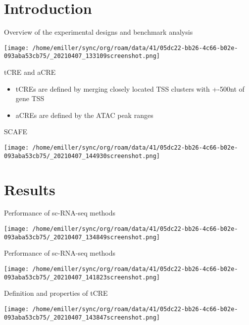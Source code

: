 \documentclass[bigger]{beamer}
\begin{document}
\section{Introduction}
\label{sec:org357da36}

\begin{frame}[label={sec:org715f231}]{Overview of the experimental designs and benchmark analysis}
\begin{center}
\texttt{[image: /home/emiller/sync/org/roam/data/41/05dc22-bb26-4c66-b02e-093aba53cb75/\_20210407\_133109screenshot.png]}
\end{center}
\end{frame}
\begin{frame}[label={sec:org93544f0}]{tCRE and aCRE}
\begin{itemize}
\item tCREs are defined by merging closely located TSS clusters with +-500nt of gene TSS
\item aCREs are defined by the ATAC peak ranges
\end{itemize}
\end{frame}
\begin{frame}[label={sec:org513a1d4}]{SCAFE}
\begin{center}
\texttt{[image: /home/emiller/sync/org/roam/data/41/05dc22-bb26-4c66-b02e-093aba53cb75/\_20210407\_144930screenshot.png]}
\end{center}
\end{frame}


\section{Results}
\label{sec:orgafbb29d}
\begin{frame}[label={sec:org93497f2}]{Performance of sc-RNA-seq methods}
\begin{center}
\texttt{[image: /home/emiller/sync/org/roam/data/41/05dc22-bb26-4c66-b02e-093aba53cb75/\_20210407\_134849screenshot.png]}
\end{center}
\end{frame}


\begin{frame}[label={sec:orgceacdb0}]{Performance of sc-RNA-seq methods}
\begin{center}
\texttt{[image: /home/emiller/sync/org/roam/data/41/05dc22-bb26-4c66-b02e-093aba53cb75/\_20210407\_141823screenshot.png]}
\end{center}
\end{frame}
\begin{frame}[label={sec:orgd82d184}]{Definition and properties of tCRE}
\begin{center}
\texttt{[image: /home/emiller/sync/org/roam/data/41/05dc22-bb26-4c66-b02e-093aba53cb75/\_20210407\_143847screenshot.png]}
\end{center}
\end{frame}
\end{document}
